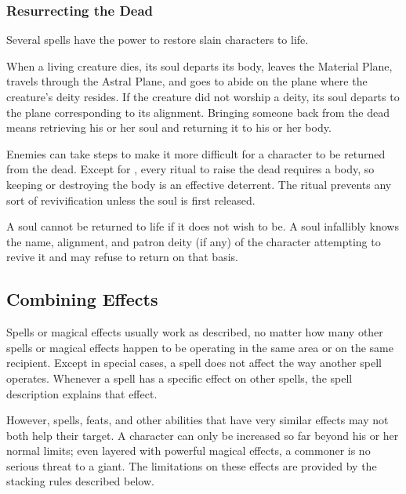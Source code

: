         \subsubsection{Resurrecting the Dead}\label{Resurrecting the Dead}

            Several spells have the power to restore slain characters to life.

            When a living creature dies, its soul departs its body, leaves the Material Plane, travels through the Astral Plane, and goes to abide on the plane where the creature's deity resides.
            If the creature did not worship a deity, its soul departs to the plane corresponding to its alignment.
            Bringing someone back from the dead means retrieving his or her soul and returning it to his or her body.

             Enemies can take steps to make it more difficult for a character to be returned from the dead.
            Except for , every ritual to raise the dead requires a body, so keeping or destroying the body is an effective deterrent.
            The  ritual prevents any sort of revivification unless the soul is first released.

             A soul cannot be returned to life if it does not wish to be.
            A soul infallibly knows the name, alignment, and patron deity (if any) of the character attempting to revive it and may refuse to return on that basis.

    \subsection{Combining Effects}
        Spells or magical effects usually work as described, no matter how many other spells or magical effects happen to be operating in the same area or on the same recipient.
        Except in special cases, a spell does not affect the way another spell operates.
        Whenever a spell has a specific effect on other spells, the spell description explains that effect.

        However, spells, feats, and other abilities that have very similar effects may not both help their target.
        A character can only be increased so far beyond his or her normal limits; even layered with powerful magical effects, a commoner is no serious threat to a giant.
        The limitations on these effects are provided by the stacking rules described below.

